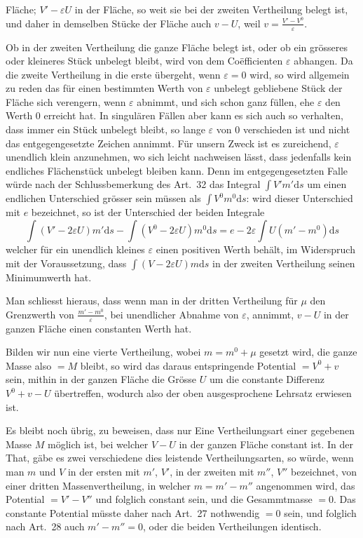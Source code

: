 Fläche; $V'-\varepsilon U$ in der Fläche, so weit sie bei der zweiten Vertheilung belegt ist, und daher in demselben Stücke der Fläche auch $v-U$, weil $v=\frac{V'-V^0}{\varepsilon}$.

Ob in der zweiten Vertheilung die ganze Fläche belegt ist, oder ob ein grösseres oder kleineres Stück unbelegt bleibt, wird von dem Coëfficienten $\varepsilon$ abhangen. Da die zweite Vertheilung in die erste übergeht, wenn $\varepsilon=0$ wird, so wird allgemein zu reden das für einen bestimmten Werth von $\varepsilon$ unbelegt gebliebene Stück der Fläche sich verengern, wenn $\varepsilon$ abnimmt, und sich schon ganz füllen, ehe $\varepsilon$ den Werth $0$ erreicht hat. In singulären Fällen aber kann es sich auch so verhalten, dass immer ein Stück unbelegt bleibt, so lange $\varepsilon$ von $0$ verschieden ist und nicht das entgegengesetzte Zeichen annimmt. Für unsern Zweck ist es zureichend, $\varepsilon$ unendlich klein anzunehmen, wo sich leicht nachweisen lässt, dass jedenfalls kein endliches Flächenstück unbelegt bleiben kann. Denn im entgegengesetzten Falle würde nach der Schlussbemerkung des Art.\ 32 das Integral $\int V'm'\mathrm ds$ um einen endlichen Unterschied grösser sein müssen als $\int V^0m^0\mathrm ds$: wird dieser Unterschied mit $e$ bezeichnet, so ist der Unterschied der beiden Integrale
\[
\int(V'-2\varepsilon U)m'\mathrm ds-\int(V^0-2\varepsilon U)m^0\mathrm ds=e-2\varepsilon\int U(m'-m^0)\mathrm ds
\]
welcher für ein unendlich kleines $\varepsilon$ einen positiven Werth behält, im Widerspruch mit der Voraussetzung, dass $\int(V-2\varepsilon U)m\mathrm ds$ in der zweiten Vertheilung seinen Minimumwerth hat.

Man schliesst hieraus, dass wenn man in der dritten Vertheilung für $\mu$ den Grenzwerth von $\frac{m'-m^0}{\varepsilon}$, bei unendlicher Abnahme von $\varepsilon$, annimmt, $v-U$ in der ganzen Fläche einen constanten Werth hat.

Bilden wir nun eine vierte Vertheilung, wobei $m=m^0+\mu$ gesetzt wird, die ganze Masse also $=M$ bleibt, so wird das daraus entspringende Potential $=V^0+v$ sein, mithin in der ganzen Fläche die Grösse $U$ um die constante Differenz $V^0+v-U$ übertreffen, wodurch also der oben ausgesprochene Lehrsatz erwiesen ist.

Es bleibt noch übrig, zu beweisen, dass nur Eine Vertheilungsart einer gegebenen Masse $M$ möglich ist, bei welcher $V-U$ in der ganzen Fläche constant ist. In der That, gäbe es zwei verschiedene dies leistende Vertheilungsarten, so würde, wenn man $m$ und $V$ in der ersten mit $m'$, $V'$, in der zweiten mit $m''$, $V''$ bezeichnet, von einer dritten Massenvertheilung, in welcher $m=m'-m''$ angenommen wird, das Potential $=V'-V''$ und folglich constant sein, und die Gesammtmasse $=0$. Das constante Potential müsste daher nach Art.\ 27 nothwendig $=0$ sein, und folglich nach Art.\ 28 auch $m'-m''=0$, oder die beiden Vertheilungen identisch.

